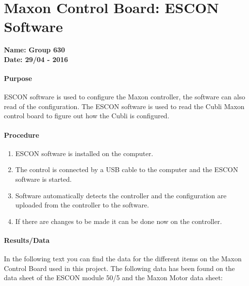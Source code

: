 \chapter{Maxon Control Board: ESCON Software}\label{MaxonControlESCON} 
\textbf{Name: Group 630}\\
\textbf{Date: 29/04 - 2016}

\subsubsection{Purpose}
ESCON software is used to configure the Maxon controller, the software can also read of the configuration. The ESCON software is used to read the Cubli Maxon control board to figure out how the Cubli is configured. 

\subsubsection{Procedure}
\begin{enumerate}
  \item ESCON software is installed on the computer.
  \item The control is connected by a USB cable to the computer and the ESCON software is started.
  \item Software automatically detects the controller and the configuration are uploaded from the controller to the software.
  \item If there are changes to be made it can be done now on the controller.
\end{enumerate}

\subsubsection{Results/Data}
In the following text you can find the data for the different items on the Maxon Control Board used in this project. The following data has been found on the data sheet of the ESCON module 50/5 and the Maxon Motor data sheet:

